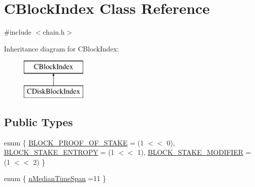 \hypertarget{class_c_block_index}{}\section{C\+Block\+Index Class Reference}
\label{class_c_block_index}


{\ttfamily \#include $<$chain.\+h$>$}

Inheritance diagram for C\+Block\+Index\+:\begin{figure}[H]
\begin{center}
\leavevmode
\includegraphics[height=2.000000cm]{class_c_block_index}
\end{center}
\end{figure}
\subsection*{Public Types}
\begin{DoxyCompactItemize}
\item 
enum \{ \hyperlink{class_c_block_index_a9f5cdb9616b0204a8906522bdc26415fa4c927ae8b8da1c98a36e08ea135e05bd}{B\+L\+O\+C\+K\+\_\+\+P\+R\+O\+O\+F\+\_\+\+O\+F\+\_\+\+S\+T\+A\+K\+E} = (1 $<$$<$ 0), 
\hyperlink{class_c_block_index_a9f5cdb9616b0204a8906522bdc26415fa36c8a91027af713584d66e1244328e3d}{B\+L\+O\+C\+K\+\_\+\+S\+T\+A\+K\+E\+\_\+\+E\+N\+T\+R\+O\+P\+Y} = (1 $<$$<$ 1), 
\hyperlink{class_c_block_index_a9f5cdb9616b0204a8906522bdc26415fa2081c64af805f5bccec3b8486ee9d5ec}{B\+L\+O\+C\+K\+\_\+\+S\+T\+A\+K\+E\+\_\+\+M\+O\+D\+I\+F\+I\+E\+R} = (1 $<$$<$ 2)
 \}
\item 
enum \{ \hyperlink{class_c_block_index_aa518b1ab90f8a0bb1df29da6063d886baa2b8ad73c4fe37a8de8748d949c334d4}{n\+Median\+Time\+Span} =11
 \}
\end{DoxyCompactItemize}
